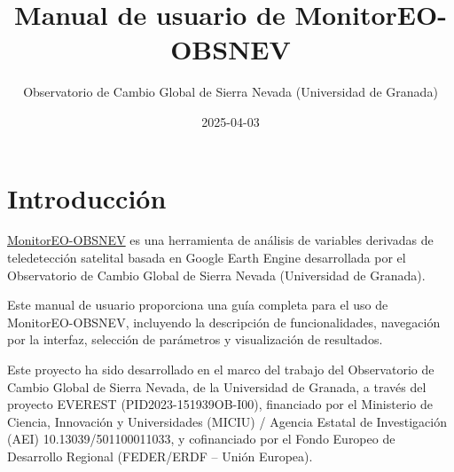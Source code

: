 \documentclass[
]{book}
\title{Manual de usuario de MonitorEO-OBSNEV}
\author{Observatorio de Cambio Global de Sierra Nevada (Universidad de Granada)}
\date{2025-04-03}
\begin{document}
\maketitle

{
\setcounter{tocdepth}{1}
\tableofcontents
}
\chapter{Introducción}\label{intro}

\href{https://sl.ugr.es/monitoreoobsnev}{MonitorEO-OBSNEV} es una herramienta de análisis de variables derivadas de teledetección satelital basada en Google Earth Engine desarrollada por el Observatorio de Cambio Global de Sierra Nevada (Universidad de Granada).

Este manual de usuario proporciona una guía completa para el uso de MonitorEO-OBSNEV, incluyendo la descripción de funcionalidades, navegación por la interfaz, selección de parámetros y visualización de resultados.

Este proyecto ha sido desarrollado en el marco del trabajo del Observatorio de Cambio Global de Sierra Nevada, de la Universidad de Granada, a través del proyecto EVEREST (PID2023-151939OB-I00), financiado por el Ministerio de Ciencia, Innovación y Universidades (MICIU) / Agencia Estatal de Investigación (AEI) 10.13039/501100011033, y cofinanciado por el Fondo Europeo de Desarrollo Regional (FEDER/ERDF -- Unión Europea).
\end{document}
